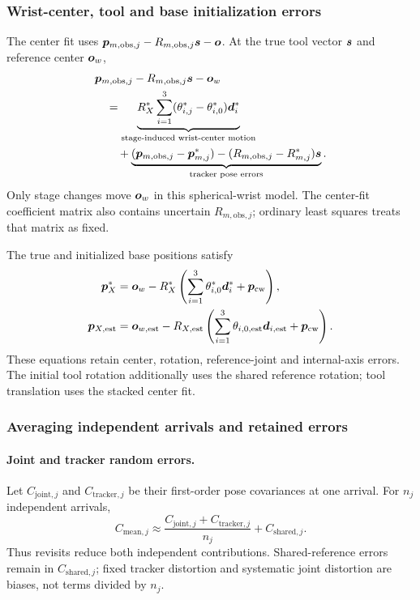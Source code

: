 \documentclass[../main.tex]{subfiles}
\begin{document}
\subsubsection{Wrist-center, tool and base initialization errors}
The center fit uses $\bm{p}_{m,\mathrm{obs},j}-R_{m,\mathrm{obs},j}\bm{s}-\bm{o}$. At the true tool vector $\bm{s}$ and reference center $\bm{o}_w$,
\begin{equation*}
\begin{aligned}
&\bm{p}_{m,\mathrm{obs},j}-R_{m,\mathrm{obs},j}\bm{s}-\bm{o}_w\\
&\quad=\underbrace{R_X^*\sum_{i=1}^{3}(\theta_{i,j}^*-\theta_{i,0}^*)\bm{d}_i^*}_{\text{stage-induced wrist-center motion}}\\
&\qquad+\underbrace{(\bm{p}_{m,\mathrm{obs},j}-\bm{p}_{m,j}^*)
-(R_{m,\mathrm{obs},j}-R_{m,j}^*)\bm{s}}_{\text{tracker pose errors}}.
\end{aligned}
\end{equation*}
Only stage changes move $\bm{o}_w$ in this spherical-wrist model. The center-fit coefficient matrix also contains uncertain $R_{m,\mathrm{obs},j}$; ordinary least squares treats that matrix as fixed.

The true and initialized base positions satisfy
\begin{equation*}
\begin{aligned}
\bm{p}_X^*&=\bm{o}_w-R_X^*\left(\sum_{i=1}^{3}\theta_{i,0}^*\bm{d}_i^*+\bm{p}_{\mathrm{cw}}\right),\\
\bm{p}_{X,\mathrm{est}}&=\bm{o}_{w,\mathrm{est}}-R_{X,\mathrm{est}}
\left(\sum_{i=1}^{3}\theta_{i,0,\mathrm{est}}\bm{d}_{i,\mathrm{est}}+\bm{p}_{\mathrm{cw}}\right).
\end{aligned}
\end{equation*}
These equations retain center, rotation, reference-joint and internal-axis errors. The initial tool rotation additionally uses the shared reference rotation; tool translation uses the stacked center fit.

\subsubsection{Averaging independent arrivals and retained errors}\label{sec:math-averaging-errors}
\paragraph{Joint and tracker random errors.}
Let $C_{\mathrm{joint},j}$ and $C_{\mathrm{tracker},j}$ be their first-order pose covariances at one arrival. For $n_j$ independent arrivals,
\begin{equation*}
C_{\mathrm{mean},j}\approx
\frac{C_{\mathrm{joint},j}+C_{\mathrm{tracker},j}}{n_j}
+C_{\mathrm{shared},j}.
\end{equation*}
Thus revisits reduce both independent contributions. Shared-reference errors remain in $C_{\mathrm{shared},j}$; fixed tracker distortion and systematic joint distortion are biases, not terms divided by $n_j$.
\end{document}
